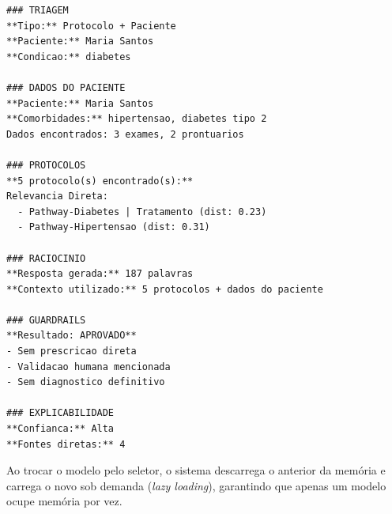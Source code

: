 \begin{lstlisting}[caption={Exemplo de report do Pipeline de Agentes na interface Gradio.}]
### TRIAGEM
**Tipo:** Protocolo + Paciente
**Paciente:** Maria Santos
**Condicao:** diabetes

### DADOS DO PACIENTE
**Paciente:** Maria Santos
**Comorbidades:** hipertensao, diabetes tipo 2
Dados encontrados: 3 exames, 2 prontuarios

### PROTOCOLOS
**5 protocolo(s) encontrado(s):**
Relevancia Direta:
  - Pathway-Diabetes | Tratamento (dist: 0.23)
  - Pathway-Hipertensao (dist: 0.31)

### RACIOCINIO
**Resposta gerada:** 187 palavras
**Contexto utilizado:** 5 protocolos + dados do paciente

### GUARDRAILS
**Resultado: APROVADO**
- Sem prescricao direta
- Validacao humana mencionada
- Sem diagnostico definitivo

### EXPLICABILIDADE
**Confianca:** Alta
**Fontes diretas:** 4
\end{lstlisting}

Ao trocar o modelo pelo seletor, o sistema descarrega o anterior da memória e carrega o novo sob demanda (\textit{lazy loading}), garantindo que apenas um modelo ocupe memória por vez.
